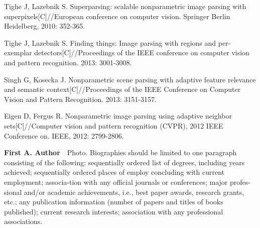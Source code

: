 \documentclass[10.5pt,compsoc]{TsT}
\theoremstyle{mystyle}
\begin{document}
{\begin{thebibliography}{99}
Tighe J, Lazebnik S. Superparsing: scalable nonparametric image parsing with superpixels[C]//European conference on computer vision. Springer Berlin Heidelberg, 2010: 352-365.

Tighe J, Lazebnik S. Finding things: Image parsing with regions and per-exemplar detectors[C]//Proceedings of the IEEE conference on computer vision and pattern recognition. 2013: 3001-3008.

Singh G, Kosecka J. Nonparametric scene parsing with adaptive feature relevance and semantic context[C]//Proceedings of the IEEE Conference on Computer Vision and Pattern Recognition. 2013: 3151-3157.

Eigen D, Fergus R. Nonparametric image parsing using adaptive neighbor sets[C]//Computer vision and pattern recognition (CVPR), 2012 IEEE Conference on. IEEE, 2012: 2799-2806.



\begin{strip}
\end{strip}

\begin{biography}
\noindent
\textbf{First A. Author}\ \  Photo. Biographies should be limited to one paragraph consisting of the following: sequentially ordered list of degrees, including years achieved; sequentially ordered places of employ concluding with current employment; associa-tion with any official journals or conferences; major profes-sional and/or academic achievements, i.e., best paper awards, research grants, etc.; any publication information (number of papers and titles of books published); current research interests; association with any professional associations.
\end{biography}


\end{thebibliography}}
\end{document}

